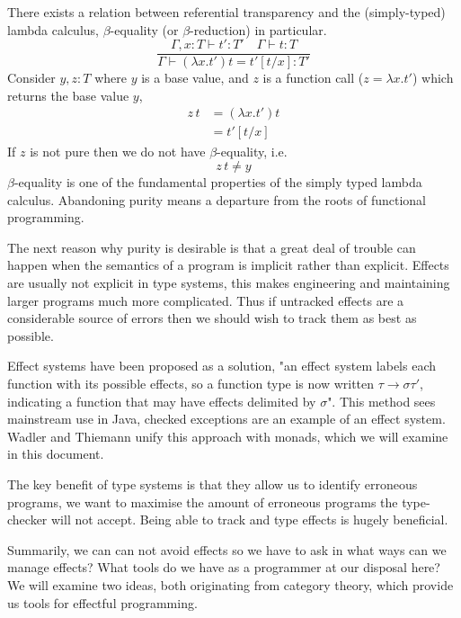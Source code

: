 There exists a relation between referential transparency and
the (simply-typed) lambda calculus,
$\beta$-equality (or $\beta$-reduction) in particular.
\begin{equation}
\frac
{\Gamma, x : T \vdash t\prime : T\prime \quad \Gamma \vdash t : T}
{\Gamma \vdash (\lambda x.t\prime)t = t\prime[t/x]: T\prime }
\end{equation}
Consider $y, z : T$ where $y$ is a base value,
and $z$ is a function call ($z = \lambda x.t\prime$)
which returns the base value $y$,
\begin{align}
    z\,t &= (\lambda x.t\prime)t \\
         &= t\prime[t/x]
\end{align}
If $z$ is not pure then we do not have $\beta$-equality, i.e.
\begin{equation}
    z\,t \neq y
\end{equation}
$\beta$-equality is one of the fundamental properties
of the simply typed lambda calculus.
Abandoning purity means a departure from
the roots of functional programming.

The next reason why purity is desirable is that
a great deal of trouble can happen when the semantics
of a program is implicit rather than explicit.
Effects are usually not explicit in type systems,
this makes engineering and
maintaining larger programs
much more complicated.
Thus if untracked effects are a considerable source of errors then we should
wish to track them as best as possible.

Effect systems\cite{jouvelot1991algebraic} have been proposed as a solution,
"an effect system labels each function with its possible effects,
so a function type is now written $\tau \rightarrow \sigma \tau\prime$,
indicating a function that may have effects delimited by $\sigma$".
This method sees mainstream use in Java,
checked exceptions are an example of an effect system.
Wadler and Thiemann\cite{wadler2003marriage}
unify this approach with monads, which we will examine in this document.

The key benefit of type systems is that they allow us to identify erroneous programs,
we want to maximise the amount of erroneous programs the type-checker will not accept.
Being able to track and type effects is hugely beneficial.

Summarily, we can can not avoid effects so
we have to ask in what ways can we manage effects?
What tools do we have as a programmer at our disposal here?
We will examine two ideas, both originating from category theory,
which provide us tools for effectful programming.
